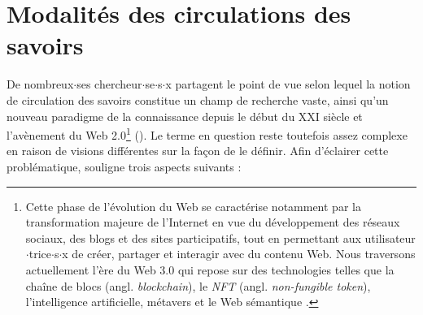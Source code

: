 \label{sota}
\section{Modalités des circulations des savoirs}
De nombreux$\cdot$ses chercheur$\cdot$se$\cdot$s$\cdot$x partagent le point de vue selon lequel la notion de \og{}circulation des savoirs\fg{} constitue un champ de recherche vaste, ainsi qu'un nouveau paradigme de la connaissance depuis le début du XXI\ieme{} siècle et l'avènement du Web 2.0\footnote{Cette phase de l'évolution du Web se caractérise notamment par la transformation majeure de l'Internet en vue du développement des réseaux sociaux, des blogs et des sites participatifs, tout en permettant aux utilisateur$\cdot$trice$\cdot$s$\cdot$x de créer, partager et interagir avec du contenu Web. Nous traversons actuellement l'ère du Web 3.0 qui repose sur des technologies telles que la chaîne de blocs (angl. \textit{blockchain}), le \textit{NFT} (angl. \textit{non-fungible token}), l'intelligence artificielle, métavers et le Web sémantique \citep{varet2023nouvelles}.}  (\citealp{landais2014frederic,quet2014frederic}). Le terme en question reste toutefois assez complexe en raison de visions différentes sur la façon de le définir. Afin d'éclairer cette problématique, \cite[pp.~221--222]{quet2014frederic} souligne trois aspects suivants :
